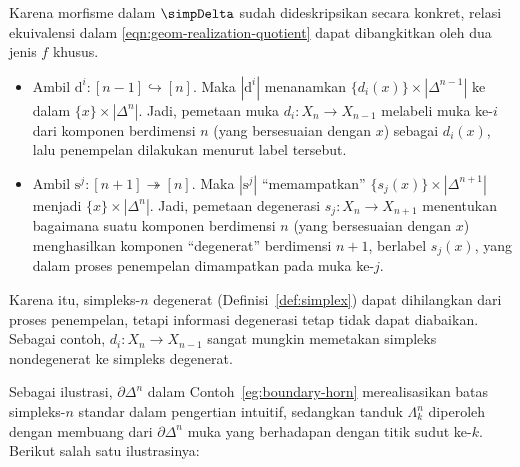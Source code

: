 Karena morfisme dalam $\simpDelta$ sudah dideskripsikan secara konkret,
relasi ekuivalensi dalam \eqref{eqn:geom-realization-quotient} dapat
dibangkitkan oleh dua jenis $f$ khusus.
\begin{itemize}
	\item Ambil $\mathrm{d}^i:[n-1]\hookrightarrow[n]$. Maka
	$|\mathrm{d}^i|$ menanamkan
	$\{d_i(x)\}\times|\Delta^{n-1}|$ ke dalam
	$\{x\}\times|\Delta^n|$. Jadi, pemetaan muka
	$d_i:X_n\to X_{n-1}$ melabeli muka ke-$i$ dari komponen berdimensi $n$
	(yang bersesuaian dengan $x$) sebagai $d_i(x)$, lalu penempelan dilakukan
	menurut label tersebut.

	\item Ambil $\mathrm{s}^j:[n+1]\twoheadrightarrow[n]$. Maka
	$|\mathrm{s}^j|$ ``memampatkan''
	$\{s_j(x)\}\times|\Delta^{n+1}|$ menjadi
	$\{x\}\times|\Delta^n|$. Jadi, pemetaan degenerasi
	$s_j:X_n\to X_{n+1}$ menentukan bagaimana suatu komponen berdimensi $n$
	(yang bersesuaian dengan $x$) menghasilkan komponen ``degenerat''
	berdimensi $n+1$, berlabel $s_j(x)$, yang dalam proses penempelan
	dimampatkan pada muka ke-$j$.
\end{itemize}
Karena itu, simpleks-$n$ degenerat (Definisi~\ref{def:simplex}) dapat
dihilangkan dari proses penempelan, tetapi informasi degenerasi tetap tidak
dapat diabaikan. Sebagai contoh, $d_i:X_n\to X_{n-1}$ sangat mungkin
memetakan simpleks nondegenerat ke simpleks degenerat.

\begin{example}
	Sebagai ilustrasi, $\partial\Delta^n$ dalam
	Contoh~\ref{eg:boundary-horn} merealisasikan batas simpleks-$n$
	standar dalam pengertian intuitif, sedangkan tanduk $\Lambda^n_k$ diperoleh
	dengan membuang dari $\partial\Delta^n$ muka yang berhadapan dengan titik
	sudut ke-$k$. Berikut salah satu ilustrasinya:
	\begin{center}\end{center}
\end{example}

